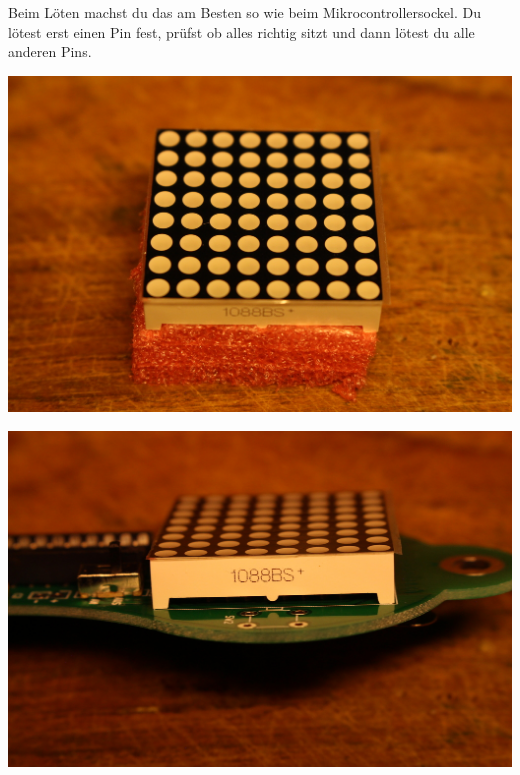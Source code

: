 \documentclass{article}
\begin{document}
Beim Löten machst du das am Besten so wie beim Mikrocontrollersockel. Du lötest erst einen Pin fest, prüfst ob alles richtig sitzt und dann lötest du alle anderen Pins.

\vspace{1cm}

\begin{minipage}[b]{0.5\textwidth}
	\includegraphics[width=\textwidth]{Bilder2021/IMG_8153.JPG}
\end{minipage}
\begin{minipage}[b]{0.5\textwidth}
	\includegraphics[width=\textwidth]{Bilder2021/IMG_8154.JPG}
\end{minipage}

\vspace{0.5cm}
\end{document}
